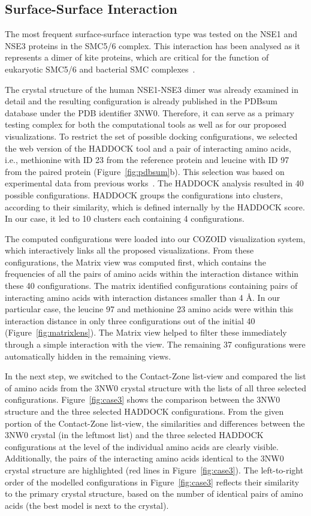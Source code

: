 \documentclass{bmcart}
\def\MatView {Matrix view\xspace}
\def\CoZoListView {Contact-Zone list-view\xspace}
\begin{document}
\subsection*{Surface-Surface Interaction}
The most frequent surface-surface interaction type was tested on the NSE1 and NSE3 proteins in the SMC5/6 complex. 
This interaction has been analysed as it represents a dimer of kite proteins, which are critical for the function of eukaryotic SMC5/6 and bacterial SMC complexes~\cite{Zabrady2016,Palecek2015,Doyle2010}. 

The crystal structure of the human NSE1-NSE3 dimer was already examined in detail and the resulting configuration is already published in the PDBsum database under the PDB identifier 3NW0. 
Therefore, it can serve as a primary testing complex for both the computational tools as well as for our proposed visualizations.
To restrict the set of possible docking configurations, we selected the web version of the HADDOCK tool and a pair of interacting amino acids, i.e., methionine with ID 23 from the reference protein and leucine with ID 97 from the paired protein (Figure~\ref{fig:pdbsum}b).
This selection was based on experimental data from previous works~\cite{Doyle2010,Hudson2011,Kozakova,Crabben}.
The HADDOCK analysis resulted in 40 possible configurations.
HADDOCK groups the configurations into clusters, according to their similarity, which is defined internally by the HADDOCK score.
In our case, it led to 10 clusters each containing 4 configurations.

The computed configurations were loaded into our COZOID visualization system, which interactively links all the proposed visualizations.
From these configurations, the \MatView was computed first, which contains the frequencies of all the pairs of amino acids within the interaction distance within these 40 configurations.
The matrix identified configurations containing pairs of interacting amino acids with interaction distances smaller than 4 \AA.
In our particular case, the leucine 97 and methionine 23 amino acids were within this interaction distance in only three configurations out of the initial 40 (Figure~\ref{fig:matrixlens}). 
The Matrix view helped to filter these immediately through a simple interaction with the view. 
The remaining 37 configurations were automatically hidden in the remaining views.

In the next step, we switched to the \CoZoListView and compared the list of amino acids from the 3NW0 crystal structure with the lists of all three selected configurations.
Figure~\ref{fig:case3} shows the comparison between the 3NW0 structure and the three selected HADDOCK configurations.
From the given portion of the \CoZoListView, the similarities and differences between the 3NW0 crystal (in the leftmost list) and the three selected HADDOCK configurations at the level of the individual amino acids are clearly visible.
Additionally, the pairs of the interacting amino acids identical to the 3NW0 crystal structure are highlighted (red lines in Figure~\ref{fig:case3}). 
The left-to-right order of the modelled configurations in Figure~\ref{fig:case3} reflects their similarity to the primary crystal structure, based on the number of identical pairs of amino acids (the best model is next to the crystal).
\end{document}
